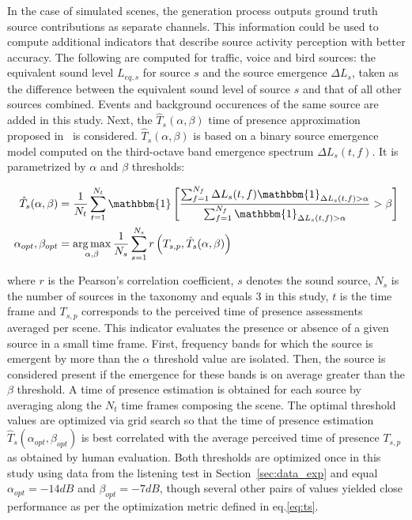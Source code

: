 \documentclass[twocolumn]{article}
\DeclareMathOperator*{\argmax}{arg\,max}
\begin{document}
In the case of simulated scenes, the generation process outputs ground truth source contributions as separate channels. This information could be used to compute additional indicators that describe source activity perception with better accuracy. The following are computed for traffic, voice and bird sources: the equivalent sound level $L_{eq, s}$ for source $s$ and the source emergence $\Delta L_{s}$, taken as the difference between the equivalent sound level of source $s$ and that of all other sources combined. Events and background occurences of the same source are added in this study. Next, the $\hat T_s(\alpha, \beta)$ time of presence approximation proposed in~\cite{gontier2018} is considered. $\hat T_s(\alpha, \beta)$ is based on a binary source emergence model computed on the third-octave band emergence spectrum $\Delta L_{s}(t, f)$. It is parametrized by $\alpha$ and $\beta$ thresholds:

\begin{align}\label{eq:ts}
\hat T_s(\alpha, \beta) &= \frac{1}{N_t}\sum_{t = 1}^{N_t}\mathbbm{1}\left[ \frac{\sum_{f = 1}^{N_f}\Delta L_{s}(t, f)\mathbbm{1}_{\Delta L_{s}(t, f)>\alpha}}{\sum_{f = 1}^{N_f}\mathbbm{1}_{\Delta L_{s}(t, f)>\alpha}}>\beta \right]\\
\alpha_{opt},\beta_{opt} &= \argmax_{\alpha, \beta}\frac{1}{N_s}\sum_{s = 1}^{N_s}r\left(T_{s, p}, \hat T_s(\alpha, \beta)\right)
\end{align}

where $r$ is the Pearson's correlation coefficient, $s$ denotes the sound source, $N_s$ is the number of sources in the taxonomy and equals 3 in this study, $t$ is the time frame and $T_{s, p}$ corresponds to the perceived time of presence assessments averaged per scene. This indicator evaluates the presence or absence of a given source in a small time frame. First, frequency bands for which the source is emergent by more than the $\alpha$ threshold value are isolated. Then, the source is considered present if the emergence for these bands is on average greater than the $\beta$ threshold. A time of presence estimation is obtained for each source by averaging along the $N_t$ time frames composing the scene. The optimal threshold values are optimized via grid search so that the time of presence estimation $\hat T_s(\alpha_{opt}, \beta_{opt})$ is best correlated with the average perceived time of presence $T_{s, p}$ as obtained by human evaluation. Both thresholds are optimized once in this study using data from the listening test in Section~\ref{sec:data_exp} and equal $\alpha_{opt} = -14dB$ and $\beta_{opt} = -7dB$, though several other pairs of values yielded close performance as per the optimization metric defined in eq.\ref{eq:ts}.
\end{document}

